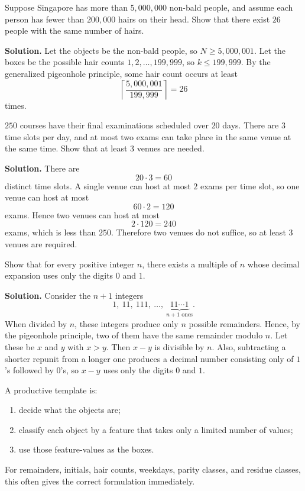 \begin{examplebox}[title={Hair coincidence}]
Suppose Singapore has more than $5{,}000{,}000$ non-bald people, and assume each person has fewer than $200{,}000$ hairs on their head. Show that there exist $26$ people with the same number of hairs.

\textbf{Solution.}
Let the objects be the non-bald people, so $N\ge 5{,}000{,}001$. Let the boxes be the possible hair counts $1,2,\dots,199{,}999$, so $k\le 199{,}999$. By the generalized pigeonhole principle, some hair count occurs at least
\[
\left\lceil \frac{5{,}000{,}001}{199{,}999}\right\rceil=26
\]
times.
\end{examplebox}

\begin{examplebox}[title={Tutorial 2, Question 2}]
$250$ courses have their final examinations scheduled over $20$ days. There are $3$ time slots per day, and at most two exams can take place in the same venue at the same time. Show that at least $3$ venues are needed.

\textbf{Solution.}
There are
\[
20\cdot 3=60
\]
distinct time slots. A single venue can host at most $2$ exams per time slot, so one venue can host at most
\[
60\cdot 2=120
\]
exams. Hence two venues can host at most
\[
2\cdot 120=240
\]
exams, which is less than $250$. Therefore two venues do not suffice, so at least $3$ venues are required.
\end{examplebox}

\begin{examplebox}[title={A multiple of $n$ using only digits $0$ and $1$}]
Show that for every positive integer $n$, there exists a multiple of $n$ whose decimal expansion uses only the digits $0$ and $1$.

\textbf{Solution.}
Consider the $n+1$ integers
\[
1,\ 11,\ 111,\ \dots,\ \underbrace{11\cdots 1}_{n+1\text{ ones}}.
\]
When divided by $n$, these integers produce only $n$ possible remainders. Hence, by the pigeonhole principle, two of them have the same remainder modulo $n$. Let these be $x$ and $y$ with $x>y$. Then $x-y$ is divisible by $n$. Also, subtracting a shorter repunit from a longer one produces a decimal number consisting only of $1$'s followed by $0$'s, so $x-y$ uses only the digits $0$ and $1$.
\end{examplebox}

\begin{extension}[title={How to search for the right pigeonhole model}]
A productive template is:
\begin{enumerate}[leftmargin=*]
    \item decide what the objects are;
    \item classify each object by a feature that takes only a limited number of values;
    \item use those feature-values as the boxes.
\end{enumerate}
For remainders, initials, hair counts, weekdays, parity classes, and residue classes, this often gives the correct formulation immediately.
\end{extension}

